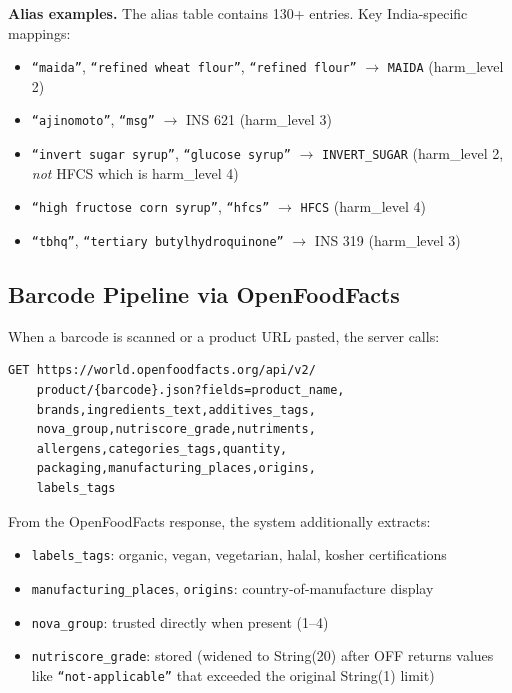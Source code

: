 \documentclass[conference]{IEEEtran}
\begin{document}
\noindent\textbf{Alias examples.} The alias table contains 130+ entries.
Key India-specific mappings:
\begin{itemize}
  \item \texttt{``maida''}, \texttt{``refined wheat flour''}, \texttt{``refined flour''}
    $\rightarrow$ \texttt{MAIDA} (harm\_level 2)
  \item \texttt{``ajinomoto''}, \texttt{``msg''} $\rightarrow$ INS 621 (harm\_level 3)
  \item \texttt{``invert sugar syrup''}, \texttt{``glucose syrup''}
    $\rightarrow$ \texttt{INVERT\_SUGAR} (harm\_level 2, \textit{not} HFCS which is harm\_level 4)
  \item \texttt{``high fructose corn syrup''}, \texttt{``hfcs''}
    $\rightarrow$ \texttt{HFCS} (harm\_level 4)
  \item \texttt{``tbhq''}, \texttt{``tertiary butylhydroquinone''} $\rightarrow$ INS 319 (harm\_level 3)
\end{itemize}

\subsection{Barcode Pipeline via OpenFoodFacts}

When a barcode is scanned or a product URL pasted, the server calls:
\begin{small}
\begin{verbatim}
GET https://world.openfoodfacts.org/api/v2/
    product/{barcode}.json?fields=product_name,
    brands,ingredients_text,additives_tags,
    nova_group,nutriscore_grade,nutriments,
    allergens,categories_tags,quantity,
    packaging,manufacturing_places,origins,
    labels_tags
\end{verbatim}
\end{small}

From the OpenFoodFacts response, the system additionally extracts:
\begin{itemize}
  \item \texttt{labels\_tags}: organic, vegan, vegetarian, halal, kosher certifications
  \item \texttt{manufacturing\_places}, \texttt{origins}: country-of-manufacture display
  \item \texttt{nova\_group}: trusted directly when present (1--4)
  \item \texttt{nutriscore\_grade}: stored (widened to String(20) after OFF returns
    values like \texttt{``not-applicable''} that exceeded the original String(1) limit)
\end{itemize}
\end{document}

